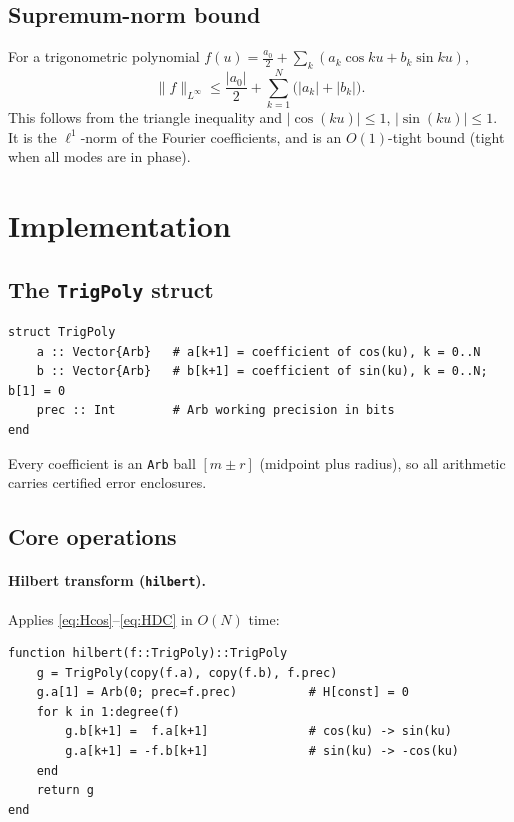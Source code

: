 \documentclass[11pt]{article}
\theoremstyle{definition}
\begin{document}
\subsection{Supremum-norm bound}

For a trigonometric polynomial $f(u) = \frac{a_0}{2} + \sum_k (a_k\cos ku + b_k\sin ku)$,
\begin{equation}\label{eq:bernstein}
  \|f\|_{L^\infty} \le \frac{|a_0|}{2} + \sum_{k=1}^N \bigl(|a_k| + |b_k|\bigr).
\end{equation}
This follows from the triangle inequality and $|\cos(ku)| \le 1$, $|\sin(ku)| \le 1$.
It is the $\ell^1$-norm of the Fourier coefficients, and is an $O(1)$-tight bound
(tight when all modes are in phase).

\section{Implementation}

\subsection{The \texttt{TrigPoly} struct}

\begin{lstlisting}
struct TrigPoly
    a :: Vector{Arb}   # a[k+1] = coefficient of cos(ku), k = 0..N
    b :: Vector{Arb}   # b[k+1] = coefficient of sin(ku), k = 0..N; b[1] = 0
    prec :: Int        # Arb working precision in bits
end
\end{lstlisting}

Every coefficient is an \texttt{Arb} ball $[m \pm r]$ (midpoint plus radius),
so all arithmetic carries certified error enclosures.

\subsection{Core operations}

\paragraph{Hilbert transform (\texttt{hilbert}).}
Applies \eqref{eq:Hcos}--\eqref{eq:HDC} in $O(N)$ time:
\begin{lstlisting}
function hilbert(f::TrigPoly)::TrigPoly
    g = TrigPoly(copy(f.a), copy(f.b), f.prec)
    g.a[1] = Arb(0; prec=f.prec)          # H[const] = 0
    for k in 1:degree(f)
        g.b[k+1] =  f.a[k+1]              # cos(ku) -> sin(ku)
        g.a[k+1] = -f.b[k+1]              # sin(ku) -> -cos(ku)
    end
    return g
end
\end{lstlisting}
\end{document}
